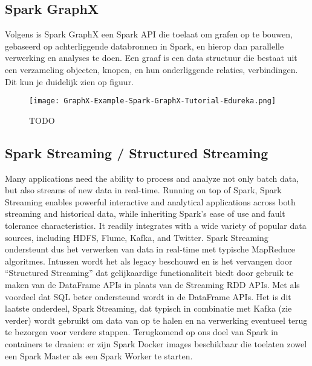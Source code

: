 \subsection{Spark GraphX}
Volgens \autocite{TODO} is Spark GraphX een Spark API die toelaat om grafen op te bouwen, gebaseerd op achterliggende databronnen in Spark, en hierop dan parallelle verwerking en analyses te doen. 
Een graaf is een data structuur die bestaat uit een verzameling objecten, knopen, en hun onderliggende relaties, verbindingen. Dit kun je duidelijk zien op figuur.
\newline
\newline
\begin{figure}
    \texttt{[image: GraphX-Example-Spark-GraphX-Tutorial-Edureka.png]}
    \caption{TODO \autocite{Dayananda2019}}
\end{figure}


\subsection{Spark Streaming / Structured Streaming}
Many applications need the ability to process and analyze not only batch data, but also streams of new data in real-time. Running on top of Spark, Spark Streaming enables powerful interactive and analytical applications across both streaming and historical data, while inheriting Spark’s ease of use and fault tolerance characteristics. It readily integrates with a wide variety of popular data sources, including HDFS, Flume, Kafka, and Twitter.\autocite{Databricks2023}
\newline
\newline
Spark Streaming ondersteunt dus het verwerken van data in real-time met typische MapReduce algoritmes. Intussen wordt het als legacy beschouwd en is het vervangen door ``Structured Streaming'' dat gelijkaardige functionaliteit biedt door gebruik te maken van de DataFrame APIs in plaats van de Streaming RDD APIs. Met als voordeel dat SQL beter ondersteund wordt in de DataFrame APIs.
\autocite{Buuck2022}
\newline
\newline
Het is dit laatste onderdeel, Spark Streaming, dat typisch in combinatie met Kafka (zie verder) wordt gebruikt om data van op te halen en na verwerking eventueel terug te bezorgen voor verdere stappen.
\newline
\newline
\newline
Terugkomend op ons doel van Spark in containers te draaien: er zijn Spark Docker images beschikbaar die toelaten zowel een Spark Master als een Spark Worker te starten.


